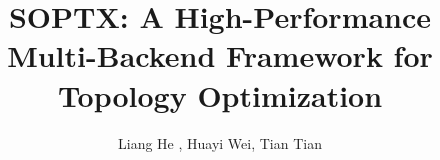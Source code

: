 \documentclass[mathpazo]{cicp}
\begin{document}
\title[Efficient Multi-Backend Implementation]{SOPTX: A High-Performance Multi-Backend Framework for Topology Optimization}


\author[He L, Wei H Y, T tian, Wang P X]{Liang He , 
Huayi Wei\comma\corrauth, Tian Tian}
\address{
\ 
School of Mathematics and Computational Science, Xiangtan University; 
National Center of  Applied Mathematics in Hunan, Hunan Key Laboratory for 
Computation and Simulation in Science and Engineering Xiangtan 411105, China
}


\end{document}

